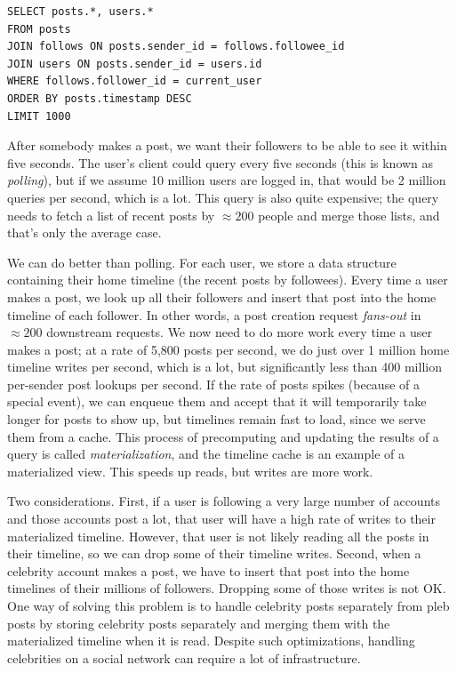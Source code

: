 \documentclass[table, xcdraw]{article}%
\begin{document}
\begin{verbatim}
SELECT posts.*, users.*
FROM posts
JOIN follows ON posts.sender_id = follows.followee_id
JOIN users ON posts.sender_id = users.id
WHERE follows.follower_id = current_user
ORDER BY posts.timestamp DESC
LIMIT 1000
\end{verbatim}

After somebody makes a post, we want their followers to be able to see it within five seconds. The user’s client could query every five seconds (this is known as \textit{polling}), but if we assume 10 million users are logged in, that would be 2 million queries per second, which is a lot. This query is also quite expensive; the query needs to fetch a list of recent posts by $\approx 200$ people and merge those lists, and that's only the average case.

We can do better than polling. For each user, we store a data structure containing their home timeline (the recent posts by followees). Every time a user makes a post, we look up all their followers and insert that post into the home timeline of each follower. In other words, a post creation request \textit{fans-out} in $\approx 200$ downstream requests. We now need to do more work every time a user makes a post; at a rate of 5,800 posts per second, we do just over 1 million home timeline writes per second, which is a lot, but significantly less than 400 million per-sender post lookups per second. If the rate of posts spikes (because of a special event), we can enqueue them and accept that it will temporarily take longer for posts to show up, but timelines remain fast to load, since we serve them from a cache. This process of precomputing and updating the results of a query is called \textit{materialization}, and the timeline cache is an example of a materialized view. This speeds up reads, but writes are more work.

Two considerations. First, if a user is following a very large number of accounts and those accounts post a lot, that user will have a high rate of writes to their materialized timeline. However, that user is not likely reading all the posts in their timeline, so we can drop some of their timeline writes. Second, when a celebrity account makes a post, we have to insert that post into the home timelines of their millions of followers. Dropping some of those writes is not OK. One way of solving this problem is to handle celebrity posts separately from pleb posts by storing celebrity posts separately and merging them with the materialized timeline when it is read. Despite such optimizations, handling celebrities on a social network can require a lot of infrastructure.
\end{document}
